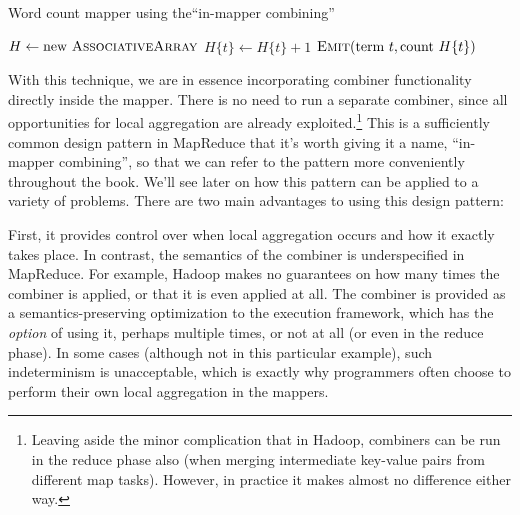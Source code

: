 \begin{algorithm}[t]
\caption{Word count mapper using the``in-mapper combining''}
\label{algorithm:chapter3:word-count:outer-hash}
\algrenewcommand{}
\algrenewcommand{}
  \begin{algorithmic}[1]
    \State $H \gets \textrm{new }\textsc{AssociativeArray}$
    \EndProcedure
    \State $H\{t\} \gets H\{t\} + 1$
    \EndFor
    \EndProcedure
    \State $\textsc{Emit}(\textrm{term }t, \textrm{count }H\{t\} )$
    \EndFor
    \EndProcedure
    \EndFunction
  \end{algorithmic}
\end{algorithm}

With this technique, we are in essence incorporating combiner
functionality directly inside the mapper.  There is no need to run a
separate combiner, since all opportunities for local aggregation are
already exploited.\footnote{Leaving aside the minor complication that
  in Hadoop, combiners can be run in the reduce phase also (when
  merging intermediate key-value pairs from different map tasks).
  However, in practice it makes almost no difference either way.} This
is a sufficiently common design pattern in MapReduce that it's worth
giving it a name, ``in-mapper combining'', so that we can refer to the
pattern more conveniently throughout the book.  We'll see later on how
this pattern can be applied to a variety of problems.  There are two
main advantages to using this design pattern:

First, it provides control over when local aggregation occurs and how
it exactly takes place.  In contrast, the semantics of the combiner is
underspecified in MapReduce.  For example, Hadoop makes no guarantees
on how many times the combiner is applied, or that it is even applied
at all.  The combiner is provided as a semantics-preserving
optimization to the execution framework, which has the \emph{option} of
using it, perhaps multiple times, or not at all (or even in the reduce
phase).  In some cases (although not in this particular example), such
indeterminism is unacceptable, which is exactly why programmers often
choose to perform their own local aggregation in the mappers.

